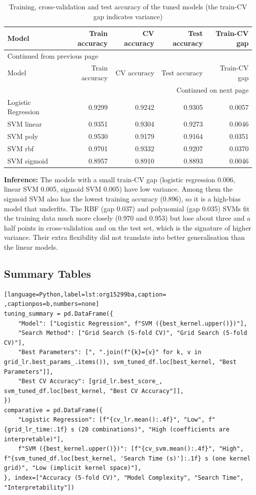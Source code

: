 \documentclass[11pt]{article}
\begin{document}
\begin{longtable}{|l|r|r|r|r|}
\caption{Training, cross-validation and test accuracy of the tuned models (the train-CV gap indicates variance)}
\\[0pt]
\hline
Model & Train accuracy & CV accuracy & Test accuracy & Train-CV gap\\[0pt]
\hline
\endfirsthead
\multicolumn{5}{l}{Continued from previous page} \\[0pt]
\hline

Model & Train accuracy & CV accuracy & Test accuracy & Train-CV gap \\[0pt]

\hline
\endhead
\hline\multicolumn{5}{r}{Continued on next page} \\
\endfoot
\endlastfoot
\hline
Logistic Regression & 0.9299 & 0.9242 & 0.9305 & 0.0057\\[0pt]
\hline
SVM linear & 0.9351 & 0.9304 & 0.9273 & 0.0046\\[0pt]
\hline
SVM poly & 0.9530 & 0.9179 & 0.9164 & 0.0351\\[0pt]
\hline
SVM rbf & 0.9701 & 0.9332 & 0.9207 & 0.0370\\[0pt]
\hline
SVM sigmoid & 0.8957 & 0.8910 & 0.8893 & 0.0046\\[0pt]
\hline
\end{longtable}

\textbf{Inference:} The models with a small train-CV gap (logistic regression 0.006, linear SVM 0.005, sigmoid
SVM 0.005) have low variance. Among them the sigmoid SVM also has the lowest training
accuracy (0.896), so it is a high-bias model that underfits. The RBF (gap 0.037) and
polynomial (gap 0.035) SVMs fit the training data much more closely (0.970 and 0.953) but
lose about three and a half points in cross-validation and on the test set, which is the
signature of higher variance. Their extra flexibility did not translate into better
generalisation than the linear models.

\subsection*{Summary Tables}
\label{sec:orgb88097e}

\begin{lstlisting}[language=Python,label=lst:org15299ba,caption= ,captionpos=b,numbers=none]
tuning_summary = pd.DataFrame({
    "Model": ["Logistic Regression", f"SVM ({best_kernel.upper()})"],
    "Search Method": ["Grid Search (5-fold CV)", "Grid Search (5-fold CV)"],
    "Best Parameters": [", ".join(f"{k}={v}" for k, v in grid_lr.best_params_.items()), svm_tuned_df.loc[best_kernel, "Best Parameters"]],
    "Best CV Accuracy": [grid_lr.best_score_, svm_tuned_df.loc[best_kernel, "Best CV Accuracy"]],
})
comparative = pd.DataFrame({
    "Logistic Regression": [f"{cv_lr.mean():.4f}", "Low", f"{grid_lr_time:.1f} s (20 combinations)", "High (coefficients are interpretable)"],
    f"SVM ({best_kernel.upper()})": [f"{cv_svm.mean():.4f}", "High", f"{svm_tuned_df.loc[best_kernel, 'Search Time (s)']:.1f} s (one kernel grid)", "Low (implicit kernel space)"],
}, index=["Accuracy (5-fold CV)", "Model Complexity", "Search Time", "Interpretability"])
\end{lstlisting}
\end{document}
